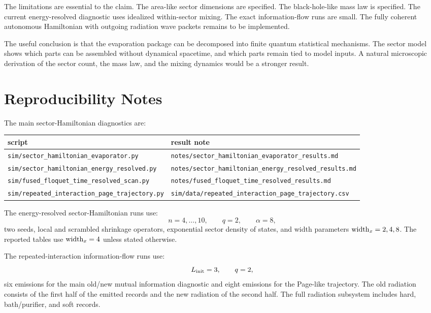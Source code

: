 \documentclass[aps,prd,onecolumn,longbibliography,nofootinbib]{revtex4-2}
\begin{document}
The limitations are essential to the claim.  The area-like sector dimensions
are specified.  The black-hole-like mass law is specified.  The current
energy-resolved diagnostic uses idealized within-sector mixing.  The exact
information-flow runs are small.  The fully coherent autonomous Hamiltonian
with outgoing radiation wave packets remains to be implemented.

The useful conclusion is that the evaporation package can be decomposed into
finite quantum statistical mechanisms.  The sector model shows which parts can
be assembled without dynamical spacetime, and which parts remain tied to model
inputs.  A natural microscopic derivation of the sector count, the mass law,
and the mixing dynamics would be a stronger result.

\appendix

\section{Reproducibility Notes}

The main sector-Hamiltonian diagnostics are:
\begin{center}
\begin{tabular}{ll}
\toprule
script & result note\\
\midrule
\texttt{sim/sector\_hamiltonian\_evaporator.py} &
\texttt{notes/sector\_hamiltonian\_evaporator\_results.md}\\
\texttt{sim/sector\_hamiltonian\_energy\_resolved.py} &
\texttt{notes/sector\_hamiltonian\_energy\_resolved\_results.md}\\
\texttt{sim/fused\_floquet\_time\_resolved\_scan.py} &
\texttt{notes/fused\_floquet\_time\_resolved\_results.md}\\
\texttt{sim/repeated\_interaction\_page\_trajectory.py} &
\texttt{sim/data/repeated\_interaction\_page\_trajectory.csv}\\
\bottomrule
\end{tabular}
\end{center}

The energy-resolved sector-Hamiltonian runs use:
\begin{equation}
    n=4,\ldots,10,\qquad q=2,\qquad \alpha=8,
\end{equation}
two seeds, local and scrambled shrinkage operators, exponential sector density
of states, and width parameters ${\rm width}_x=2,4,8$.  The reported tables use
${\rm width}_x=4$ unless stated otherwise.

The repeated-interaction information-flow runs use:
\begin{equation}
    L_{\rm init}=3,\qquad q=2,
\end{equation}
six emissions for the main old/new mutual information diagnostic and eight
emissions for the Page-like trajectory.  The old radiation consists of the
first half of the emitted records and the new radiation of the second half.
The full radiation subsystem includes hard, bath/purifier, and soft records.
\end{document}
